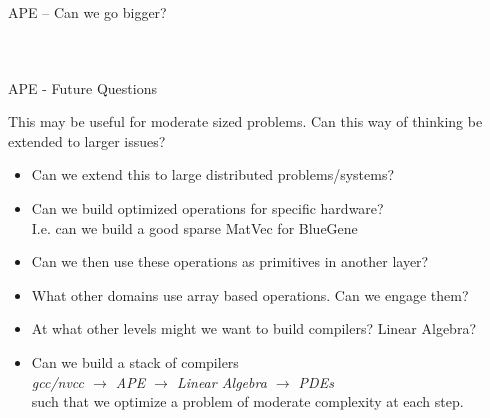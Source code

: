 \documentclass[9pt, compress, blue]{beamer}
\begin{document}
\begin{frame}{APE -- Can we go bigger?}
\begin{columns}
\begin{figure}
\end{figure}
\end{columns}
\end{frame}


\begin{frame}{APE - Future Questions}

This may be useful for moderate sized problems. Can this way of thinking be
extended to larger issues? 

\begin{itemize}
\item Can we extend this to large distributed problems/systems?
\item Can we build optimized operations for specific hardware? \\
I.e. can we build a good sparse MatVec for BlueGene
\item Can we then use these operations as primitives in another layer? 
\item What other domains use array based operations. Can we engage them?
\item At what other levels might we want to build compilers? Linear Algebra?
\item Can we build a stack of compilers \\
\textit{gcc/nvcc $\rightarrow$ APE $\rightarrow$ Linear Algebra $\rightarrow$
PDEs} \\
such that we optimize a problem of moderate complexity at each step. 
\end{itemize}
\end{frame}
\end{document}
